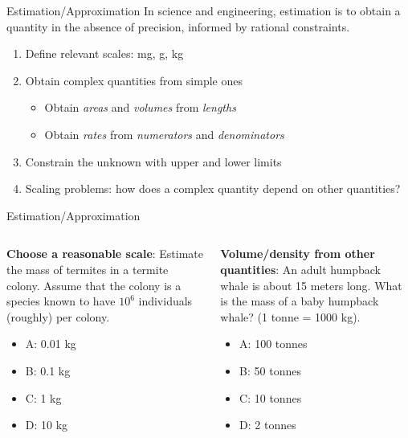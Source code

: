 \documentclass{beamer}
\begin{document}
\begin{frame}{Estimation/Approximation}
In science and engineering, \alert{estimation} is to obtain a quantity in the absence of precision, informed by rational constraints.
\begin{enumerate}
\item Define relevant \alert{scales}: mg, g, kg
\item Obtain \alert{complex quantities} from simple ones
\begin{itemize}
\item Obtain \textit{areas} and \textit{volumes} from \textit{lengths}
\item Obtain \textit{rates} from \textit{numerators} and \textit{denominators}
\end{itemize}
\item Constrain the unknown with \alert{upper} and \alert{lower} limits
\item Scaling problems: how does a complex quantity depend on other quantities?
\end{enumerate}
\end{frame}

\begin{frame}{Estimation/Approximation}
\small
\begin{columns}[T]
\begin{column}{0.5\textwidth}
\textbf{Choose a reasonable scale}: Estimate the mass of termites in a termite colony.  Assume that the colony is a species known to have $10^6$ individuals (roughly) per colony.
\begin{itemize}
\item A: 0.01 kg
\item B: 0.1 kg
\item C: 1 kg
\item D: 10 kg
\end{itemize}
\end{column}
\begin{column}{0.5\textwidth}
\textbf{Volume/density from other quantities}: An adult humpback whale is about 15 meters long.  What is the mass of a baby humpback whale? (1 tonne = 1000 kg).
\vspace{0.55cm}
\begin{itemize}
\item A: 100 tonnes
\item B: 50 tonnes
\item C: 10 tonnes
\item D: 2 tonnes
\end{itemize}
\end{column}
\end{columns}
\end{frame}
\end{document}
